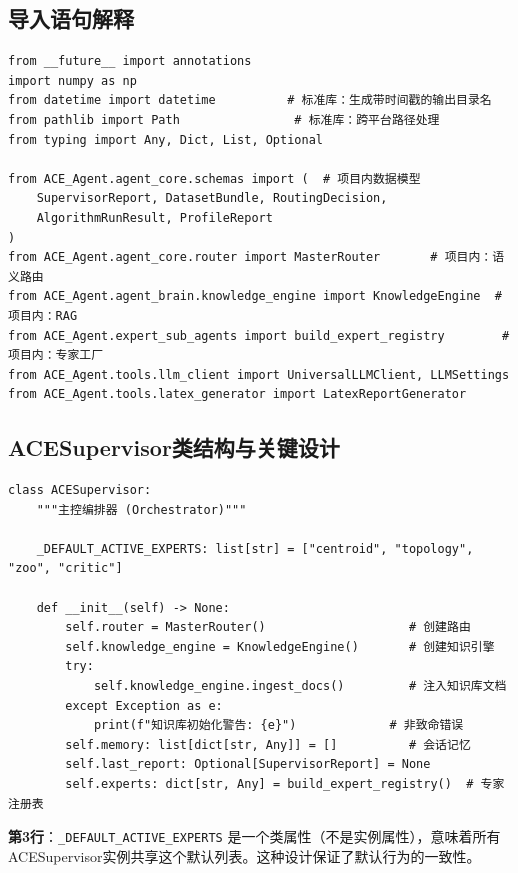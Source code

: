 \documentclass[11pt,a4paper]{ctexbook}
\begin{document}
\subsection{导入语句解释}

\begin{verbatim}
from __future__ import annotations
import numpy as np
from datetime import datetime          # 标准库：生成带时间戳的输出目录名
from pathlib import Path                # 标准库：跨平台路径处理
from typing import Any, Dict, List, Optional

from ACE_Agent.agent_core.schemas import (  # 项目内数据模型
    SupervisorReport, DatasetBundle, RoutingDecision,
    AlgorithmRunResult, ProfileReport
)
from ACE_Agent.agent_core.router import MasterRouter       # 项目内：语义路由
from ACE_Agent.agent_brain.knowledge_engine import KnowledgeEngine  # 项目内：RAG
from ACE_Agent.expert_sub_agents import build_expert_registry        # 项目内：专家工厂
from ACE_Agent.tools.llm_client import UniversalLLMClient, LLMSettings
from ACE_Agent.tools.latex_generator import LatexReportGenerator
\end{verbatim}

\subsection{ACESupervisor类结构与关键设计}

\begin{verbatim}
class ACESupervisor:
    """主控编排器 (Orchestrator)"""

    _DEFAULT_ACTIVE_EXPERTS: list[str] = ["centroid", "topology", "zoo", "critic"]

    def __init__(self) -> None:
        self.router = MasterRouter()                    # 创建路由
        self.knowledge_engine = KnowledgeEngine()       # 创建知识引擎
        try:
            self.knowledge_engine.ingest_docs()         # 注入知识库文档
        except Exception as e:
            print(f"知识库初始化警告: {e}")             # 非致命错误
        self.memory: list[dict[str, Any]] = []          # 会话记忆
        self.last_report: Optional[SupervisorReport] = None
        self.experts: dict[str, Any] = build_expert_registry()  # 专家注册表
\end{verbatim}

\textbf{第3行}：\verb|_DEFAULT_ACTIVE_EXPERTS| 是一个类属性（不是实例属性），意味着所有ACESupervisor实例共享这个默认列表。这种设计保证了默认行为的一致性。
\end{document}
